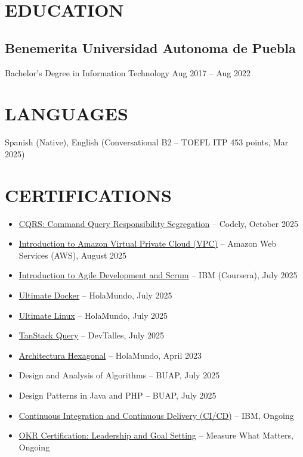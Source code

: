 \documentclass[a4paper,10pt]{article}
\begin{document}
\section*{EDUCATION}

\subsection*{Benemerita Universidad Autonoma de Puebla}
Bachelor's Degree in Information Technology \hfill Aug 2017 -- Aug 2022

\section*{LANGUAGES}
Spanish (Native), English (Conversational B2 -- TOEFL ITP 453 points, Mar 2025)

\section*{CERTIFICATIONS}
\begin{itemize}[noitemsep, leftmargin=*]
    \item \href{https://www.linkedin.com/in/jose-carlos-huerta-garcia-773952212/details/certifications}{CQRS: Command Query Responsibility Segregation} -- Codely, October 2025
    \item \href{https://www.linkedin.com/in/jose-carlos-huerta-garcia-773952212/details/certifications}{Introduction to Amazon Virtual Private Cloud (VPC)} -- Amazon Web Services (AWS), August 2025
    \item \href{https://www.coursera.org/account/accomplishments/verify/D02Q5G7CT9H5}{Introduction to Agile Development and Scrum} -- IBM (Coursera), July 2025
    \item \href{https://academia.holamundo.io/certificates/fifvbfywmp}{Ultimate Docker} -- HolaMundo, July 2025
    \item \href{https://academia.holamundo.io/certificates/lsv1rybd6k}{Ultimate Linux} -- HolaMundo, July 2025
    \item \href{https://cursos.devtalles.com/certificates/80vdvpk0jq}{TanStack Query} -- DevTalles, July 2025
    \item \href{https://www.linkedin.com/in/jose-carlos-huerta-garcia-773952212/details/certifications/1758852008410/single-media-viewer/?profileId=ACoAADXjsscBqtjtdk4S_qpdkHwZsFn9y9TiG0o}{Architectura Hexagonal} -- HolaMundo, April 2023
    \item Design and Analysis of Algorithms -- BUAP, July 2025
    \item Design Patterns in Java and PHP -- BUAP, July 2025
    \item \href{https://www.coursera.org/programs/knu-high-o3k80/learn/continuous-integration-and-continuous-delivery-ci-cd?source=search}{Continuous Integration and Continuous Delivery (CI/CD)} -- IBM, Ongoing
    \item \href{https://www.coursera.org/learn/okr}{OKR Certification: Leadership and Goal Setting} -- Measure What Matters, Ongoing
\end{itemize}
\end{document}
